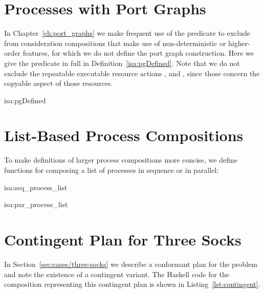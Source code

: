 \documentclass[class=smolathesis,crop=false]{standalone}
\begin{document}
\cbstart
\section{Processes with Port Graphs}
\label{app:pgDefined}

In Chapter~\ref{ch:port_graphs} we make frequent use of the predicate  to exclude from consideration compositions that make use of non-deterministic or higher-order features, for which we do not define the port graph construction.
Here we give the predicate in full in Definition~\ref{isa:pgDefined}.
Note that we do not exclude the repeatable executable resource actions ,  and , since those concern the copyable aspect of those resources.

\begin{isadef}{isa:pgDefined}
  
\end{isadef}
\cbend

\section{List-Based Process Compositions}
\label{app:process-list}

To make definitions of larger process compositions more concise, we define functions for composing a list of processes in sequence or in parallel:
\begin{isadef}{isa:seq_process_list}
  
\end{isadef}

\begin{isadef}{isa:par_process_list}
  
\end{isadef}

\cbstart
\section{Contingent Plan for Three Socks}
\label{app:three-socks-contingent}

In Section~\ref{sec:cases/three-socks} we describe a conformant plan for the problem and note the existence of a contingent variant.
The Haskell code for the composition representing this contingent plan is shown in Listing~\ref{lst:contingent}.
\end{document}
